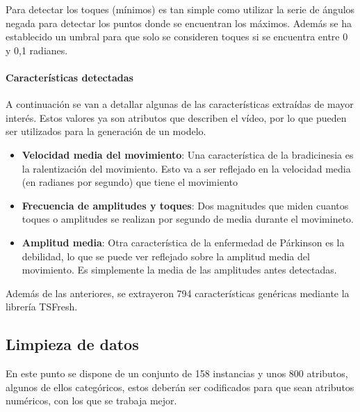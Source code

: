 
Para detectar los toques (mínimos) es tan simple como utilizar la serie de
ángulos negada para detectar los puntos donde se encuentran los máximos. Además
se ha establecido un umbral para que solo se consideren toques si se encuentra
entre 0 y 0,1 radianes.


\paragraph{Características detectadas}

A continuación se van a detallar algunas de las características extraídas de
mayor interés. Estos valores ya son atributos que describen el vídeo, por lo que
pueden ser utilizados para la generación de un modelo.

\begin{itemize}
    \item \textbf{Velocidad media del movimiento}: Una característica de la
    bradicinesia es la ralentización del movimiento. Esto va a ser reflejado en
    la velocidad media (en radianes por segundo) que tiene el movimiento
    \item \textbf{Frecuencia de amplitudes y toques}: Dos magnitudes que miden
    cuantos toques o amplitudes se realizan por segundo de media durante el
    movimineto.
    \item \textbf{Amplitud media}: Otra característica de la enfermedad de
    Párkinson es la debilidad, lo que se puede ver reflejado sobre la amplitud
    media del movimiento. Es simplemente la media de las amplitudes antes
    detectadas.
\end{itemize}

Además de las anteriores, se extrayeron 794 características genéricas
mediante la librería TSFresh.

\subsection{Limpieza de datos}

En este punto se dispone de un conjunto de 158 instancias y unos 800 atributos,
algunos de ellos categóricos, estos deberán ser codificados para que sean
atributos numéricos, con los que se trabaja mejor.

